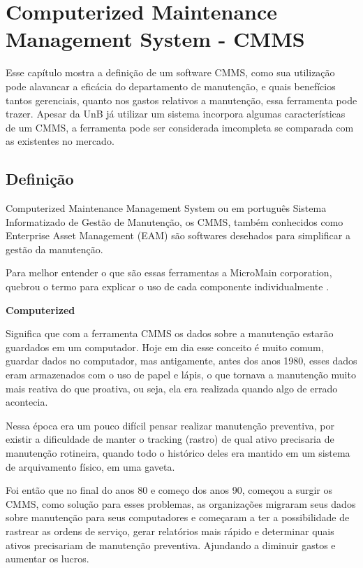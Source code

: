 \chapter{Computerized Maintenance Management System - CMMS}
\label{cmms}

Esse capítulo mostra a definição de um software CMMS, como sua utilização pode alavancar a eficácia do departamento de manutenção, e quais benefícios tantos gerenciais, quanto nos gastos relativos a manutenção, essa ferramenta pode trazer. Apesar da UnB já utilizar um sistema incorpora algumas características de um CMMS, a ferramenta pode ser considerada imcompleta se comparada com as existentes no mercado.

\section{Definição}

Computerized Maintenance Management System ou em português Sistema Informatizado de Gestão de Manutenção, os CMMS, também conhecidos como Enterprise Asset Management (EAM) são softwares desehados para simplificar a gestão da manutenção.

Para melhor entender o que são essas ferramentas a MicroMain corporation, quebrou o termo para explicar o uso de cada componente individualmente \cite{micromain}.

\textbf{Computerized}

Significa que com a ferramenta CMMS os dados sobre a manutenção estarão guardados em um computador. Hoje em dia esse conceito é muito comum, guardar dados no computador, mas antigamente, antes dos anos 1980, esses dados eram armazenados com o uso de papel e lápis, o que tornava a manutenção muito mais reativa do que proativa, ou seja, ela era realizada quando algo de errado acontecia. 

Nessa época era um pouco difícil pensar realizar manutenção preventiva, por existir a dificuldade de manter o tracking (rastro) de qual ativo precisaria de manutenção rotineira, quando todo o histórico deles era mantido em um sistema de arquivamento físico, em uma gaveta. 

Foi então que no final do anos 80 e começo dos anos 90, começou a surgir os CMMS, como solução para esses problemas, as organizações migraram seus dados sobre manutenção para seus computadores e começaram a ter a possibilidade de rastrear as ordens de serviço, gerar relatórios mais rápido e determinar quais ativos precisariam de manutenção preventiva. Ajundando a diminuir gastos e aumentar os lucros. 

